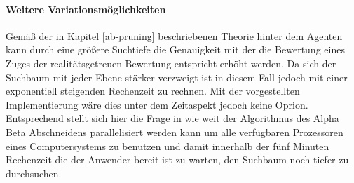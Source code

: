 \paragraph{Weitere Variationsmöglichkeiten}
Gemäß der in Kapitel \ref{ab-pruning} beschriebenen Theorie hinter dem Agenten  kann durch eine größere Suchtiefe  die Genauigkeit mit der die Bewertung eines Zuges der realitätsgetreuen Bewertung entspricht erhöht werden. Da sich der Suchbaum mit jeder Ebene stärker verzweigt ist in diesem Fall jedoch mit einer exponentiell steigenden Rechenzeit zu rechnen. Mit der vorgestellten Implementierung wäre dies unter dem Zeitaspekt jedoch keine Oprion. Entsprechend stellt sich hier die Frage in wie weit der Algorithmus des Alpha Beta Abschneidens parallelisiert werden kann um alle verfügbaren Prozessoren eines Computersystems zu benutzen und damit innerhalb der fünf Minuten Rechenzeit die der Anwender bereit ist zu warten, den Suchbaum noch tiefer zu durchsuchen.



